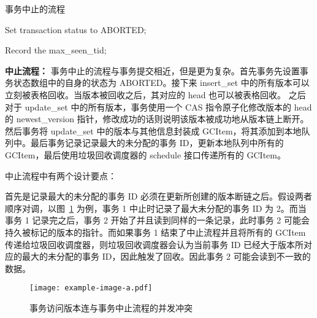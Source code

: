 \begin{algorithm}[h]
    \caption{事务中止的流程}
    \label{alg:abort}
    \BlankLine
    Set transaction status to ABORTED;



    Record the max\_seen\_tid;



\end{algorithm}

\textbf{中止流程：} 事务中止的流程与事务提交相近，但是更为复杂。首先事务先设置事务状态数组中的自身的状态为 ABORTED。接下来 insert\_set 中的所有版本可以立刻被表格回收。当版本被回收之后，其对应的 head 也可以被表格回收。
之后对于 update\_set 中的所有版本，事务使用一个 CAS 指令原子化修改版本的 head 的 newest\_version 指针，修改成功的话则说明该版本被成功地从版本链上断开。然后事务将 update\_set 中的版本与其他信息封装成 GCItem，将其添加到本地队列中。最后事务记录记录最大的未分配的事务 ID，更新本地队列中所有的 GCItem，最后使用垃圾回收调度器的 schedule 接口传递所有的 GCItem。

中止流程中有两个设计要点：

首先是记录最大的未分配的事务 ID 必须在更新所创建的版本断链之后。假设两者顺序对调，以图~\ref{fig:update-abort-read} 为例，事务 1 中止时记录了最大未分配的事务 ID 为 2。而当事务 1 记录完之后，事务 2 开始了并且读到同样的一条记录，此时事务 2 可能会持久被标记的版本的指针。而如果事务 1 结束了中止流程并且将所有的 GCItem 传递给垃圾回收调度器，则垃圾回收调度器会认为当前事务 ID 已经大于版本所对应的最大的未分配的事务 ID，因此触发了回收。因此事务 2 可能会读到不一致的数据。

\begin{figure}
    \centering
    \texttt{[image: example-image-a.pdf]}
    \caption{事务访问版本连与事务中止流程的并发冲突}
    \label{fig:update-abort-read}
\end{figure}


